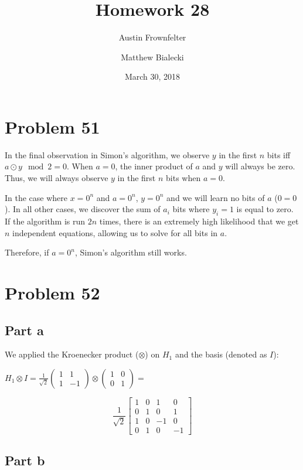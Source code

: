 \documentclass{article}
\title{Homework 28}
\author{Austin Frownfelter \and Matthew Bialecki}
\date{March 30, 2018}
\begin{document}
\maketitle

\section{Problem 51}

In the final observation in Simon's algorithm, we observe $y$ in the first $n$ bits iff $a \odot y \mod 2 = 0$.  When $a = 0$, the inner product of $a$ and $y$ will always be zero.  Thus, we will always observe $y$ in the first $n$ bits when $a=0$.

In the case where $x=0^n$ and $a=0^n$, $y=0^n$ and we will learn no bits of $a$ ($0=0$).  In all other cases, we discover the sum of $a_i$ bits where $y_i=1$ is equal to zero.  If the algorithm is run $2n$ times, there is an extremely high likelihood that we get $n$ independent equations, allowing us to solve for all bits in $a$.  

Therefore, if $a=0^n$, Simon's algorithm still works.

\section{Problem 52}

\subsection{Part a}

We applied the Kroenecker product ($\otimes$) on $H_1$ and the basis (denoted as $I$):

$H_1 \otimes I = \frac1{\sqrt2}(\begin{smallmatrix} 1&1\\1&-1 \end{smallmatrix}) \otimes (\begin{smallmatrix} 1&0\\0&1 \end{smallmatrix})=$

\[
\frac1{\sqrt2}
\begin{bmatrix}
1 & 0 & 1 & 0\\
0 & 1 & 0 & 1\\
1 & 0 & -1 & 0\\
0 & 1 & 0 & -1
\end{bmatrix}
\]

\subsection{Part b}
\end{document}
